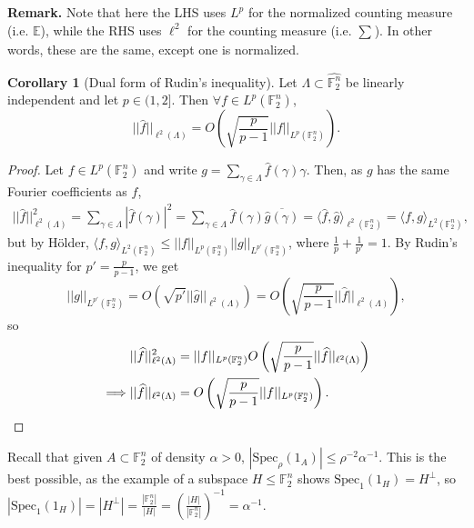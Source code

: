 \documentclass{article}
\theoremstyle{definition}
\newtheorem{cor}[theorem]{Corollary}
\begin{document}
\textbf{Remark.} Note that here the LHS uses $L^p$ for the normalized counting measure (i.e. $\mathbb{E}$), while the RHS uses $\ell^2$ for the counting measure (i.e. $\sum_{}^{} $). In other words, these are the same, except one is normalized. 
\begin{cor}[Dual form of Rudin's inequality]\label{cor3.3}
    Let $\Lambda \subset  \widehat{\mathbb{F}_2^n}$ be linearly independent and let $p \in (1,2]$. Then $\forall f \in L^p (\mathbb{F}_2^n)$, \[
    ||\widehat{f}||_{\ell^2(\Lambda)} = O \left(\sqrt{\frac{p}{p-1}} ||f||_{L^p(\mathbb{F}_2^n)}\right).
    \]
\end{cor}
\begin{proof}
    Let $f \in L^p(\mathbb{F}_2^n)$ and write $g = \sum_{\gamma \in \Lambda}^{} \widehat{f}(\gamma)\gamma$. Then, as $g$ has the same Fourier coefficients as $f$,
    \begin{align*}
        ||\widehat{f}||_{\ell^2(\Lambda)}^2 = \sum_{\gamma \in \Lambda}^{} \left|\widehat{f}(\gamma)\right|^2 = \sum_{\gamma \in \Lambda} \widehat{f}(\gamma)\overline{\widehat{g}(\gamma)} = \langle \widehat{f},\widehat{g} \rangle_{\ell^2(\mathbb{F}_2^n)} = \langle f,g \rangle_{L^2(\mathbb{F}_2^n)},
    \end{align*}
    but by Hölder, $\langle f,g \rangle_{L^2(\mathbb{F}_2^n)} \le ||f||_{L^p(\mathbb{F}_2^n)}||g||_{L^{p'}(\mathbb{F}_2^n)}$, where $\frac{1}{p} + \frac{1}{p'} = 1$. By Rudin's inequality for $p' = \frac{p}{p-1}$, we get \[
    ||g||_{L^{p'}(\mathbb{F}_2^n)} = O \left(\sqrt{p'} ||\widehat{g}||_{\ell^2(\Lambda)}\right) = O \left(\sqrt{\frac{p}{p-1}}||\widehat{f}||_{\ell^2(\Lambda)} \right),
    \]
    so 
    \begin{align*}
        &||\widehat{f}||^2_{\ell^2(\Lambda)} = ||f||_{L^p(\mathbb{F}_2^n)} O \left(\sqrt{\frac{p}{p-1}} ||\widehat{f}||_{\ell^2(\Lambda)}\right) \\
        \implies & ||\widehat{f}||_{\ell^2(\Lambda)} = O \left(\sqrt{\frac{p}{p-1}} ||f||_{L^p(\mathbb{F}_2^n)}\right).
        \qedhere
    \end{align*}
\end{proof}
Recall that given $A \subset \mathbb{F}_2^n$ of density $\alpha>0$, $\left|\text{Spec}_{\rho}(1_A)\right| \le \rho^{-2}\alpha^{-1}$. This is the best possible, as the example of a subspace $H \le \mathbb{F}_2^n$ shows $\text{Spec}_1(1_H) = H^\perp$, so $\left|\text{Spec}_1(1_H)\right| = \left|H^\perp\right| = \frac{\left|\mathbb{F}_2^n\right|}{\left|H\right|} = \left(\frac{\left|H\right|}{\left|\mathbb{F}_2^n\right|}\right)^{-1} = \alpha^{-1}$.
\end{document}
